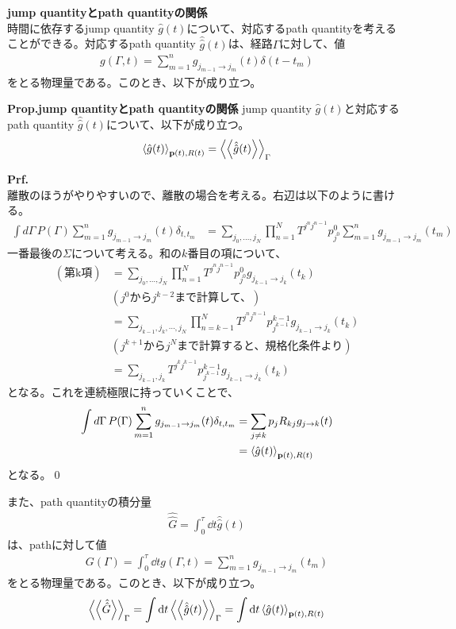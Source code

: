 \documentclass[a4paper,11pt]{jsarticle}
\numberwithin{equation}{section}
\begin{document}
\noindent
\textbf{jump quantityとpath quantityの関係}\\
時間に依存するjump quantity $\hat{g}(t)$について、対応するpath quantityを考えることができる。対応するpath quantity $\hat{\hat{g}}(t)$は、経路$\Gamma$に対して、値
\begin{align}
    g(\Gamma,t) = \sum_{m=1}^{n} g_{j_{m-1} \to j_{m}}(t) \delta(t-t_{m})
\end{align}
をとる物理量である。このとき、以下が成り立つ。
\begin{itembox}[l]{\textbf{Prop.jump quantityとpath quantityの関係}}
    jump quantity $\hat{g}(t)$と対応するpath quantity $\hat{\hat{g}}(t)$について、以下が成り立つ。
    \begin{align}
        \ev{\hat{g}(t)}_{\vb{p}(t),R(t)} = \ev{\ev{\hat{\hat{g}}(t)}}_{\Gamma}
    \end{align}
\end{itembox}
\textbf{Prf.}\\
離散のほうがやりやすいので、離散の場合を考える。右辺は以下のように書ける。
\begin{align}
    \int d\Gamma \, P(\Gamma) \sum_{m=1}^{n} g_{j_{m-1} \to j_{m}}(t) \delta_{t,t_m}
    &= \sum_{j_0, \dots, j_N} \prod_{n=1}^N T^{j^n j^{n-1}} p^0_{j^0} 
    \sum_{m=1}^{n} g_{j_{m-1} \to j_{m}}(t_m) 
\end{align}
一番最後の$\Sigma$について考える。和の$k$番目の項について、
\begin{align}
    (\text{第k項}) &= \sum_{j_0, \dots, j_N} \prod_{n=1}^N T^{j^n j^{n-1}} p^0_{j^0} g_{j_{k-1} \to j_{k}}(t_k) \\
    &(j^{0}\text{から}j^{k-2}\text{まで計算して、}) \nonumber \\
    &= \sum_{j_{k-1}, j_k, \cdots, j_N} \prod_{n=k-1}^N T^{j^n j^{n-1}} p^{k-1}_{j^{k-1}} g_{j_{k-1} \to j_{k}}(t_k) \\
    &(j^{k+1}\text{から}j^{N}\text{まで計算すると、規格化条件より}) \nonumber \\
    &= \sum_{j_{k-1}, j_k} T^{j^k j^{k-1}} p^{k-1}_{j^{k-1}} g_{j_{k-1} \to j_{k}}(t_k)
\end{align}
となる。これを連続極限に持っていくことで、
\begin{align}
    \int d\Gamma \, P(\Gamma) \sum_{m=1}^{n} g_{j_{m-1} \to j_{m}}(t) \delta_{t,t_m}
    &= \sum_{j\neq k} p_{j} R_{kj} g_{j \to k}(t)\\
    &= \ev{\hat{g}(t)}_{\vb{p}(t), R(t)}
\end{align}
となる。\qed

また、path quantityの積分量
\begin{align}
    {\hat{\hat{G}}}= \int_{0}^{\tau} \dd{t} \hat{\hat{g}}(t)
\end{align}
は、pathに対して値
\begin{align}
    G(\Gamma) = \int_{0}^{\tau} \dd{t} g(\Gamma,t) = \sum_{m=1}^{n} g_{j_{m-1} \to j_{m}}(t_{m})
\end{align}
をとる物理量である。このとき、以下が成り立つ。
\begin{align}
    \ev{\ev{\hat{\hat{G}}}}_{\Gamma} = \int \dd{t} \ev{\ev{\hat{\hat{g}}(t)}}_{\Gamma} = \int \dd{t} \ev{\hat{g}(t)}_{\vb{p}(t),R(t)}
\end{align}
\end{document}
